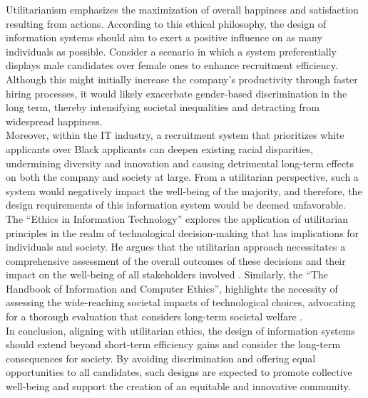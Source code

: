 \documentclass[12pt,a4paper]{article}
\begin{document}
Utilitarianism emphasizes the maximization of overall happiness and satisfaction resulting from actions. According to this ethical philosophy, the design of information systems should aim to exert a positive influence on as many individuals as possible. Consider a scenario in which a system preferentially displays male candidates over female ones to enhance recruitment efficiency. Although this might initially increase the company's productivity through faster hiring processes, it would likely exacerbate gender-based discrimination in the long term, thereby intensifying societal inequalities and detracting from widespread happiness.\\

\noindent Moreover, within the IT industry, a recruitment system that prioritizes white applicants over Black applicants can deepen existing racial disparities, undermining diversity and innovation and causing detrimental long-term effects on both the company and society at large. From a utilitarian perspective, such a system would negatively impact the well-being of the majority, and therefore, the design requirements of this information system would be deemed unfavorable.\\

\noindent The ``Ethics in Information Technology'' explores the application of utilitarian principles in the realm of technological decision-making that has implications for individuals and society. He argues that the utilitarian approach necessitates a comprehensive assessment of the overall outcomes of these decisions and their impact on the well-being of all stakeholders involved \citep{question_1.1}. Similarly, the ``The Handbook of Information and Computer Ethics'', highlights the necessity of assessing the wide-reaching societal impacts of technological choices, advocating for a thorough evaluation that considers long-term societal welfare \citep{question_1.2}.\\

\noindent In conclusion, aligning with utilitarian ethics, the design of information systems should extend beyond short-term efficiency gains and consider the long-term consequences for society. By avoiding discrimination and offering equal opportunities to all candidates, such designs are expected to promote collective well-being and support the creation of an equitable and innovative community.


\pagebreak
\end{document}
